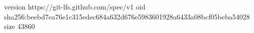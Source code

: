 version https://git-lfs.github.com/spec/v1
oid sha256:beebd7ea76e1c315edec684a632d676e5983601928a6433a08bcf05beba54028
size 43860
